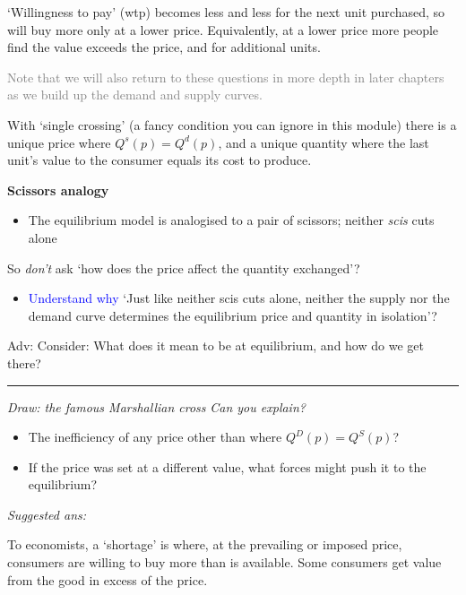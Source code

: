 \documentclass[]{article}
\providecommand{\tightlist}{%
  \setlength{\itemsep}{0pt}\setlength{\parskip}{0pt}}
\begin{document}
`Willingness to pay' (wtp) becomes less and less for the next unit
purchased, so will buy more only at a lower price. Equivalently, at a
lower price more people find the value exceeds the price, and for
additional units.

\textcolor{gray}{Note that we will also return to these questions in more depth in later chapters as we build up the demand and supply curves.}

\bigskip

With `single crossing' (a fancy condition you can ignore in this module)
there is a unique price where \(Q^s(p)=Q^d(p)\), and a unique quantity
where the last unit's value to the consumer equals its cost to produce.

\textbf{Scissors analogy}

\begin{itemize}
\tightlist
\item
  The equilibrium model is analogised to a pair of scissors; neither
  \emph{scis} cuts alone
\end{itemize}

So \emph{don't} ask `how does the price affect the quantity exchanged'?

\begin{itemize}
\tightlist
\item
  \textcolor{blue}{Understand why} `Just like neither scis cuts alone,
  neither the supply nor the demand curve determines the equilibrium
  price and quantity in isolation'?
\end{itemize}

\textcolor{RawSienna}{Adv: Consider: What does it mean to be at equilibrium, and how do we get there?}

\begin{center}\rule{0.5\linewidth}{\linethickness}\end{center}

\emph{Draw: the famous Marshallian cross} \emph{Can you explain?}

\begin{itemize}
\item
  The inefficiency of any price other than where \(Q^D(p)=Q^S(p)\)?
\item
  If the price was set at a different value, what forces might push it
  to the equilibrium?
\end{itemize}

\bigskip

\emph{Suggested ans:}

To economists, a `shortage' is where, at the prevailing or imposed
price, consumers are willing to buy more than is available. Some
consumers get value from the good in excess of the price.\\
\end{document}
